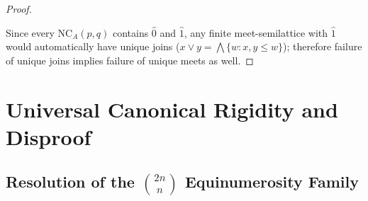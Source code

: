 \documentclass[11pt]{article}
\theoremstyle{definition}
\newcommand{\NCA}{\mathrm{NC}_A}
\begin{document}
\begin{proof}
\begin{itemize}
\end{itemize}
Since every $\NCA(p,q)$ contains $\hat{0}$ and $\hat{1}$, any finite meet-semilattice with $\hat{1}$ would automatically have unique joins ($x \vee y = \bigwedge \{w : x, y \le w\}$); therefore failure of unique joins implies failure of unique meets as well.
\end{proof}

\section{Universal Canonical Rigidity and Disproof}

\subsection{Resolution of the \texorpdfstring{$\binom{2n}{n}$}{C(2n, n)} Equinumerosity Family}
\end{document}
